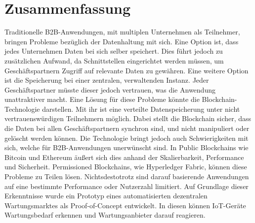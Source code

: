 \pagestyle{empty} %

\chapter*{Zusammenfassung} %
\label{cha:abtract}

Traditionelle B2B-Anwendungen, mit multiplen Unternehmen als Teilnehmer, bringen Probleme bezüglich der Datenhaltung mit sich. Eine Option ist, dass jedes Unternehmen Daten bei sich selber speichert. Dies führt jedoch zu zusätzlichen Aufwand, da Schnittstellen eingerichtet werden müssen, um Geschäftspartnern Zugriff auf relevante Daten zu gewähren. Eine weitere Option ist die Speicherung bei einer zentralen, verwaltenden Instanz. Jeder Geschäftspartner müsste dieser jedoch vertrauen, was die Anwendung unattraktiver macht. Eine Lösung für diese Probleme könnte die Blockchain-Technologie darstellen. Mit ihr ist eine verteilte Datenspeicherung unter nicht vertrauenswürdigen Teilnehmern möglich. Dabei stellt die Blockchain sicher, dass die Daten bei allen Geschäftspartnern synchron sind, und nicht manipuliert oder gelöscht werden können. Die Technologie bringt jedoch auch Schwierigkeiten mit sich, welche für B2B-Anwendungen unerwünscht sind. In Public Blockchains wie Bitcoin und Ethereum äußert sich dies anhand der Skalierbarkeit, Performance und Sicherheit. Permissioned Blockchains, wie Hyperledger Fabric, können diese Probleme zu Teilen lösen. Nichtsdestotrotz sind darauf basierende Anwendungen auf eine bestimmte Performance oder Nutzerzahl limitiert. Auf Grundlage dieser Erkenntnisse wurde ein Prototyp eines automatisierten dezentralen Wartungsmarktes als Proof-of-Concept entwickelt. In diesen können IoT-Geräte Wartungsbedarf erkennen und Wartungsanbieter darauf reagieren.
